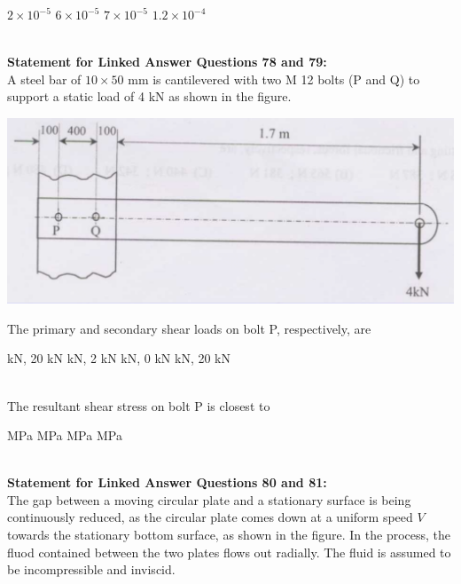 \documentclass[addpoints,11pt]{exam}
\begin{document}
\begin{questions}
    \begin{oneparchoices}
        \choice $2\times10^{-5}$
        \choice $6\times10^{-5}$
        \choice $7\times10^{-5}$
        \choice $1.2\times10^{-4}$
    \end{oneparchoices}\\

\normalsize\textbf{Statement for Linked Answer Questions 78 and 79:}\\
A steel bar of $10\times50$ mm is cantilevered with two M 12 bolts (P and Q) to support a static load of 4 kN as shown in the figure.

\begin{center}
    \includegraphics[scale=0.3]{q78}
\end{center}
    \question The primary and secondary shear loads on bolt P, respectively, are\\

    \begin{oneparchoices}
         kN, 20 kN
         kN, 2 kN
         kN, 0 kN
         kN, 20 kN
    \end{oneparchoices}\\

    \question The resultant shear stress on bolt P is closest to\\

    \begin{oneparchoices}
         MPa
         MPa
         MPa
         MPa
    \end{oneparchoices}\\

\normalsize\textbf{Statement for Linked Answer Questions 80 and 81:}\\
The gap between a moving circular plate and a stationary surface is being continuously reduced, as the circular plate comes down at a uniform speed $V$ towards the stationary bottom surface, as shown in the figure. In the process, the fluod contained between the two plates flows out radially. The fluid is assumed to be incompressible and inviscid.


\end{questions}
\end{document}
